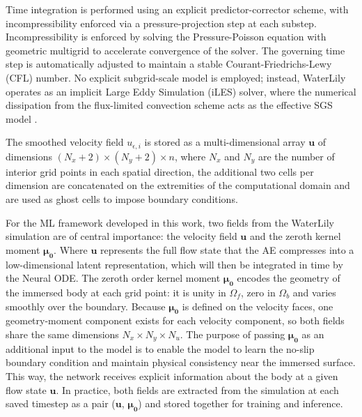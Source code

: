 Time integration is performed using an explicit predictor-corrector scheme, with incompressibility enforced via a pressure-projection step at each substep. Incompressibility is enforced by solving the Pressure-Poisson equation with geometric multigrid to accelerate convergence of the solver. The governing time step is automatically adjusted to maintain a stable Courant-Friedrichs-Lewy (CFL) number. No explicit subgrid-scale model is employed; instead, WaterLily operates as an implicit Large Eddy Simulation (iLES) solver, where the numerical dissipation from the flux-limited convection scheme acts as the effective SGS model \cite{Margolin2006}.

The smoothed velocity field $u_{\epsilon, i}$ is stored as a multi-dimensional array $\mathbf{u}$ of dimensions $(N_x+2) \times (N_y+2) \times n$, where $N_x$ and $N_y$ are the number of interior grid points in each spatial direction, the additional two cells per dimension are concatenated on the extremities of the computational domain and are used as ghost cells to impose boundary conditions. 

For the ML framework developed in this work, two fields from the WaterLily simulation are of central importance: the velocity field $\mathbf{u}$ and the zeroth kernel moment $\boldsymbol{\mu_0}$. Where $\mathbf{u}$ represents the full flow state that the AE compresses into a low-dimensional latent representation, which will then be integrated in time by the Neural ODE. The zeroth order kernel moment $\boldsymbol{\mu_0}$ encodes the geometry of the immersed body at each grid point: it is unity in $\Omega_f$, zero in $\Omega_b$ and varies smoothly over the boundary. Because $\boldsymbol{\mu_0}$ is defined on the velocity faces, one geometry-moment component exists for each velocity component, so both fields share the same dimensions $N_x \times N_y \times N_u$. The purpose of passing $\boldsymbol{\mu_0}$ as an additional input to the model is to enable the model to learn the no-slip boundary condition and maintain physical consistency near the immersed surface. This way, the network receives explicit information about the body at a given flow state $\mathbf{u}$. In practice, both fields are extracted from the simulation at each saved timestep as a pair ($\mathbf{u}$, $\boldsymbol{\mu_0}$) and stored together for training and inference.



